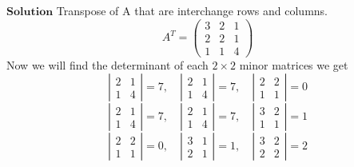 $\boxed{\textbf{Solution}}$ Transpose of A that are interchange rows and columns.
$$
A^{T}=\left(\begin{array}{lll}
3 & 2 & 1 \\
2 & 2 & 1 \\
1 & 1 & 4
\end{array}\right)
$$
Now we will find the determinant of each $2 \times 2$ minor matrices we get
$$
\left|\begin{array}{ll}
2 & 1 \\
1 & 4
\end{array}\right|=7,\quad \left|\begin{array}{ll}
2 & 1 \\
1 & 4
\end{array}\right|=7,\quad \left|\begin{array}{ll}
2 & 2 \\
1 & 1
\end{array}\right|=0
$$
$$
\left|\begin{array}{ll}
2 & 1 \\
1 & 4
\end{array}\right|=7,\quad \left|\begin{array}{ll}
2 & 1 \\
1 & 4
\end{array}\right|=7,\quad \left|\begin{array}{ll}
3 & 2 \\
1 & 1
\end{array}\right|=1
$$
$$
\left|\begin{array}{ll}
2 & 2 \\
1 & 1
\end{array}\right|=0,\quad \left|\begin{array}{ll}
3 & 1 \\
2 & 1
\end{array}\right|=1,\quad \left|\begin{array}{ll}
3 & 2 \\
2 & 2
\end{array}\right|=2
$$

